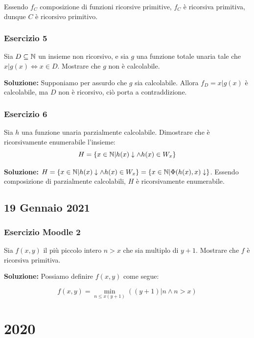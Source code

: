Essendo \(f_C\) composizione di funzioni ricorsive primitive, \(f_C\) è ricorsiva primitiva, dunque \(C\) è ricorsivo primitivo.

\subsubsection{Esercizio 5}

Sia \(D\subseteq \mathbb{N}\) un insieme non ricorsivo, e sia \(g\) una funzione totale unaria tale che \(x \vert g(x) \iff x \in D\). Mostrare che \(g\) non è calcolabile.

\textbf{Soluzione: } Supponiamo per assurdo che \(g\) sia calcolabile. Allora \(f_D=x\vert g(x)\) è calcolabile, ma \(D\) non è ricorsivo, ciò porta a contraddizione.

\subsubsection{Esercizio 6}

Sia \(h\) una funzione unaria parzialmente calcolabile. Dimostrare che è ricorsivamente enumerabile l'insieme:
\begin{equation}
  H=\displaystyle{\left\{{x \in \mathbb{N}\vert h(x) \downarrow \land h(x) \in W_x}\right\}}
\end{equation}

\textbf{Soluzione: } \(H=\displaystyle{\left\{{x \in \mathbb{N}\vert h(x) \downarrow \land h(x) \in W_x}\right\}}=\displaystyle{\left\{{x \in \mathbb{N}\vert \Phi(h(x),x) \downarrow}\right\}}\). Essendo composizione di parzialmente calcolabili, \(H\) è ricorsivamente enumerabile.

\subsection{19 Gennaio 2021}

\subsubsection{Esercizio Moodle 2}

Sia \(f(x,y)\) il più piccolo intero \(n>x\) che sia multiplo di \(y+1\). Mostrare che \(f\) è ricorsiva primitiva.

\textbf{Soluzione: } Possiamo definire \(f(x,y)\) come segue:

\begin{equation}
  f(x,y)= \min_{n\leq x(y+1)} ( (y+1) \vert n \land n > x)
\end{equation}

\section{2020}

